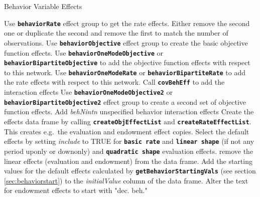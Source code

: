 \documentclass[12pt,a4paper]{article}
\makeatletter
\renewcommand{\=}{\,=\,}
\newcommand{\+}{\,+\,}
\newcommand{\nnm}[1]{\textsf{\small\textit{#1}}}
\renewcommand{\subsection}{\@startsection{subsection}{2}
                {0pt}{0.7\baselineskip}{0.3\baselineskip}
                {\sffamily} }
\newcommand{\sfn}[1]{\textbf{\texttt{#1}}}
\makeatother
\begin{document}
\subsection{Behavior Variable Effects}
\begin{algorithmic}
\STATE Use \sfn{behaviorRate} effect group to get the rate effects. Either
remove the second one or duplicate the second and remove the first to match the
number of observations.
\STATE Use \sfn{behaviorObjective} effect group to create the basic objective
function effects.
\STATE Use \sfn{behaviorOneModeObjective} or \sfn{behaviorBipartiteObjective} to
add the objective function effects with respect to this network.
\STATE Use \sfn{behaviorOneModeRate} or \sfn{behaviorBipartiteRate} to add
the rate effects with respect to this network.
\ENDFOR
{}
\STATE Call \sfn{covBehEff} to add the interaction effects
\ENDFOR
{}
\STATE Use \sfn{behaviorOneModeObjective2} or \sfn{behaviorBipartiteObjective2}
effect group to create a second set of objective function effects.
\ENDFOR
\STATE Add  \nnm{behNintn} unspecified behavior interaction effects
  \STATE Create the effects data frame by calling \sfn{createObjEffectList} and
  \sfn{createRateEffectList}.  This creates e.g.\ the evaluation and endowment
  effect copies.
  \STATE Select the default effects by setting \nnm{include} to TRUE for
  \sfn{basic rate} and \sfn{linear shape}
  (if not any period uponly or downonly)
  and \sfn{quadratic shape}
  evaluation effects.
  \STATE remove the linear effects (evaluation and endowment)
  from the data frame.
  \ENDIF
  \STATE Add the starting values for the default effects calculated by
  \sfn{getBehaviorStartingVals}  (see section \ref{sec:behaviorstart})
 to the \nnm{initialValue} column of the data
  frame.
\STATE Alter the text for endowment effects to start with "dec. beh."
\end{algorithmic}
\end{document}
